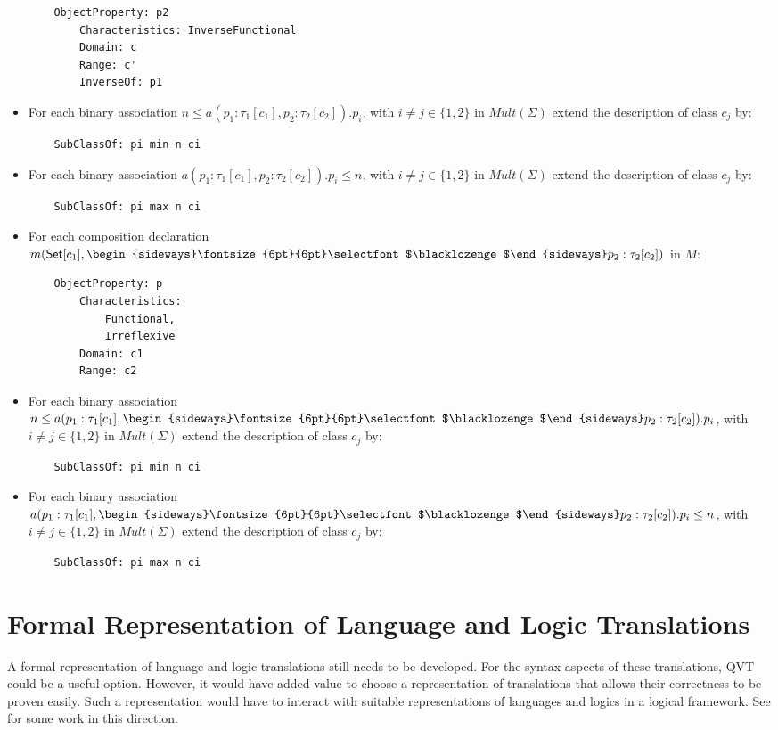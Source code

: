 \documentclass[10pt,fleqn,final]{scrreprt}
\newcommand{\cbs}[0]{\color{red}\xspace} %
\newcommand{\cbe}[0]{\color{black}\xspace} %
\newcommand{\sclause}[1]{\section{#1}}
\newenvironment{definitions}[0]{\medskip }{}
\newcommand{\composition}{\raisebox{0.2pt}{\begin{sideways}\fontsize{6pt}{6pt}\selectfont$\blacklozenge$\end{sideways}}}
\begin{document}
\begin{definitions}
\begin{itemize}
\begin{lstlisting}
	ObjectProperty: p2
		Characteristics: InverseFunctional
		Domain: c
		Range: c'
		InverseOf: p1
\end{lstlisting}
\item For each binary association $n \leq a(p_1:\tau_1[c_1],p_2:\tau_2[c_2]).p_i$, with $i \neq j\in\{1,2\}$ in $\mathit{Mult}(\Sigma)$ extend the description of class $c_j$ by:
\begin{lstlisting}
	SubClassOf: pi min n ci
\end{lstlisting}
\item For each binary association $a(p_1:\tau_1[c_1],p_2:\tau_2[c_2]).p_i \leq n$, with $i \neq j\in\{1,2\}$  in $\mathit{Mult}(\Sigma)$ extend the description of class $c_j$ by:
\begin{lstlisting}
	SubClassOf: pi max n ci
\end{lstlisting}
\item For each composition declaration $m(\mathsf{Set}[c_1], \composition p_2 :
\tau_2[c_2])$ in $M$:
\begin{lstlisting}
	ObjectProperty: p
		Characteristics:
			Functional, 
			Irreflexive
		Domain: c1
		Range: c2
\end{lstlisting}
\item For each binary association $n \leq a(p_1:\tau_1[c_1], \composition p_2:\tau_2[c_2]).p_i$, with $i \neq j\in\{1,2\}$  in $\mathit{Mult}(\Sigma)$  extend the description of class $c_j$ by:
\begin{lstlisting}
	SubClassOf: pi min n ci
\end{lstlisting}
\item For each binary association $a(p_1:\tau_1[c_1], \composition p_2:\tau_2[c_2]).p_i \leq n$, with $i \neq j\in\{1,2\}$  in $\mathit{Mult}(\Sigma)$ extend the description of class $c_j$ by:
\begin{lstlisting}
	SubClassOf: pi max n ci
\end{lstlisting}
\end{itemize}
\cbe 

\sclause{Formal Representation of Language and Logic Translations}
\label{sec:repr-trans}
\cbs
A formal representation of language and logic translations still needs
to be developed. For the syntax aspects of these translations, QVT
could be a useful option. However, it would have added value to choose
a representation of translations that allows  their correctness
to be proven easily. Such a representation would have to interact
with suitable representations of languages and logics in a 
logical framework. See \cite{CodescuEtAl2011d} for some work
in this direction.
\cbe


\end{definitions}
\end{document}
